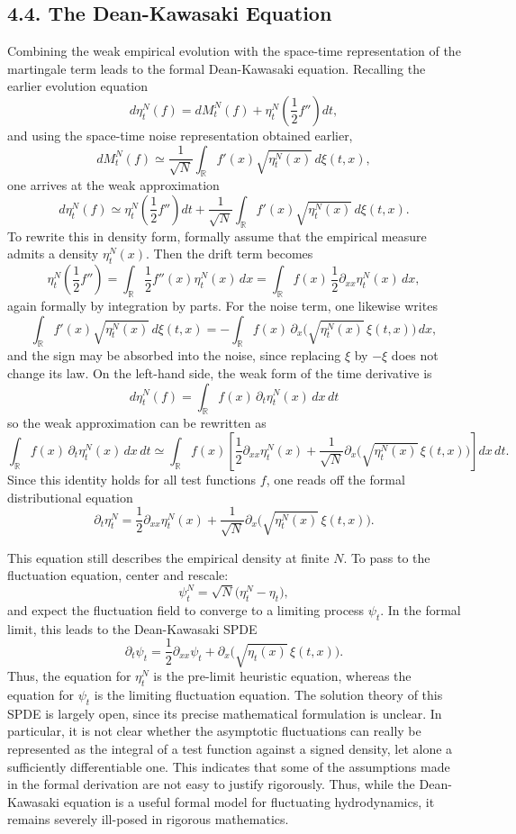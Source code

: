 \documentclass[11pt]{article}
\theoremstyle{definition}
\theoremstyle{remark}
\begin{document}
\subsection*{4.4. The Dean-Kawasaki Equation}
Combining the weak empirical evolution with the space-time representation of the martingale term leads to the formal Dean-Kawasaki equation. Recalling the earlier evolution equation
\[
d\eta_t^N(f)=dM_t^N(f)+\eta_t^N\!\left(\frac{1}{2}f''\right)dt,
\]
and using the space-time noise representation obtained earlier,
\[
dM_t^N(f)\simeq \frac{1}{\sqrt{N}}\int_{\mathbb R} f'(x)\sqrt{\eta_t^N(x)}\,d\xi(t,x),
\]
one arrives at the weak approximation
\[
d\eta_t^N(f)\simeq \eta_t^N\!\left(\frac{1}{2}f''\right)dt+\frac{1}{\sqrt{N}}\int_{\mathbb R} f'(x)\sqrt{\eta_t^N(x)}\,d\xi(t,x).
\]
To rewrite this in density form, formally assume that the empirical measure admits a density $\eta_t^N(x)$. Then the drift term becomes
\[
\eta_t^N\!\left(\frac{1}{2}f''\right)=\int_{\mathbb R} \frac{1}{2}f''(x)\eta_t^N(x)\,dx=\int_{\mathbb R} f(x)\,\frac{1}{2}\partial_{xx}\eta_t^N(x)\,dx,
\]
again formally by integration by parts. For the noise term, one likewise writes
\[
\int_{\mathbb R} f'(x)\sqrt{\eta_t^N(x)}\,d\xi(t,x)=-\int_{\mathbb R} f(x)\,\partial_x\bigl(\sqrt{\eta_t^N(x)}\,\xi(t,x)\bigr)\,dx,
\]
and the sign may be absorbed into the noise, since replacing $\xi$ by $-\xi$ does not change its law. On the left-hand side, the weak form of the time derivative is
\[
d\eta_t^N(f)=\int_{\mathbb R} f(x)\,\partial_t\eta_t^N(x)\,dx\,dt
\]
so the weak approximation can be rewritten as
\[
\int_{\mathbb R} f(x)\,\partial_t\eta_t^N(x)\,dx\,dt \simeq \int_{\mathbb R} f(x)\left[\frac{1}{2}\partial_{xx}\eta_t^N(x)+\frac{1}{\sqrt{N}}\partial_x\bigl(\sqrt{\eta_t^N(x)}\,\xi(t,x)\bigr)\right]dx\,dt.
\]
Since this identity holds for all test functions $f$, one reads off the formal distributional equation
\[
\partial_t\eta_t^N=\frac{1}{2}\partial_{xx}\eta_t^N(x)+\frac{1}{\sqrt{N}}\partial_x\bigl(\sqrt{\eta_t^N(x)}\,\xi(t,x)\bigr).
\]

This equation still describes the empirical density at finite $N$. To pass to the fluctuation equation, center and rescale:
\[
\psi_t^N=\sqrt{N}\bigl(\eta_t^N-\eta_t\bigr),
\]
and expect the fluctuation field to converge to a limiting process $\psi_t$. In the formal limit, this leads to the Dean-Kawasaki SPDE
\[
\partial_t\psi_t=\frac{1}{2}\partial_{xx}\psi_t+\partial_x\bigl(\sqrt{\eta_t(x)}\,\xi(t,x)\bigr).
\]
Thus, the equation for $\eta_t^N$ is the pre-limit heuristic equation, whereas the equation for $\psi_t$ is the limiting fluctuation equation.
The solution theory of this SPDE is largely open, since its precise mathematical formulation is unclear. In particular, it is not clear whether the asymptotic fluctuations can really be represented as the integral of a test function against a signed density, let alone a sufficiently differentiable one. This indicates that some of the assumptions made in the formal derivation are not easy to justify rigorously. Thus, while the Dean-Kawasaki equation is a useful formal model for fluctuating hydrodynamics, it remains severely ill-posed in rigorous mathematics.
\end{document}
